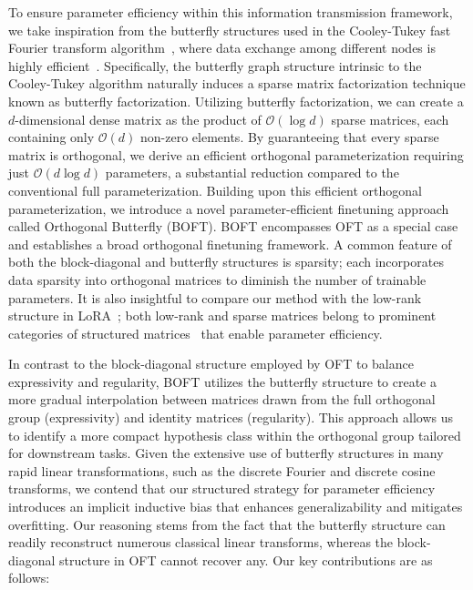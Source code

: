 To ensure parameter efficiency within this information transmission framework, we take inspiration from the butterfly structures used in the Cooley-Tukey fast Fourier transform algorithm~\cite{cooley1965algorithm}, where data exchange among different nodes is highly efficient~\cite{klasing1994broadcasting}. Specifically, the butterfly graph structure intrinsic to the Cooley-Tukey algorithm naturally induces a sparse matrix factorization technique known as butterfly factorization. Utilizing butterfly factorization, we can create a $d$-dimensional dense matrix as the product of $\mathcal{O}(\log d)$ sparse matrices, each containing only $\mathcal{O}(d)$ non-zero elements. By guaranteeing that every sparse matrix is orthogonal, we derive an efficient orthogonal parameterization requiring just $\mathcal{O}(d \log d)$ parameters, a substantial reduction compared to the conventional full parameterization. Building upon this efficient orthogonal parameterization, we introduce a novel parameter-efficient finetuning approach called Orthogonal Butterfly (BOFT). BOFT encompasses OFT as a special case and establishes a broad orthogonal finetuning framework. A common feature of both the block-diagonal and butterfly structures is sparsity; each incorporates data sparsity into orthogonal matrices to diminish the number of trainable parameters. It is also insightful to compare our method with the low-rank structure in LoRA~\cite{hulora2022}; both low-rank and sparse matrices belong to prominent categories of structured matrices~\cite{candes2011robust} that enable parameter efficiency.

In contrast to the block-diagonal structure employed by OFT to balance expressivity and regularity, BOFT utilizes the butterfly structure to create a more gradual interpolation between matrices drawn from the full orthogonal group (expressivity) and identity matrices (regularity). This approach allows us to identify a more compact hypothesis class within the orthogonal group tailored for downstream tasks. Given the extensive use of butterfly structures in many rapid linear transformations, such as the discrete Fourier and discrete cosine transforms, we contend that our structured strategy for parameter efficiency introduces an implicit inductive bias that enhances generalizability and mitigates overfitting. Our reasoning stems from the fact that the butterfly structure can readily reconstruct numerous classical linear transforms, whereas the block-diagonal structure in OFT cannot recover any. Our key contributions are as follows:

